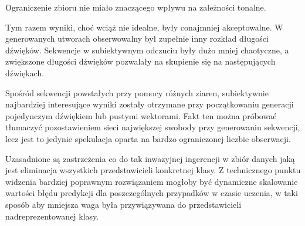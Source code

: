 {{        %

        Ograniczenie zbioru nie miało znaczącego wpływu na zależności tonalne.


        Tym razem wyniki, choć wciąż nie idealne, były conajmniej akceptowalne. W generowanych utworach
        obserwowalny był zupełnie inny rozkład długości dźwięków. Sekwencje w subiektywnym odczuciu były dużo mniej
        chaotyczne, a zwiększone długości dźwięków pozwalały na skupienie się na następujących dźwiękach.
        
        Spośród sekwencji powstałych przy pomocy różnych ziaren, subiektywnie najbardziej interesujące wyniki
        zostały otrzymane przy początkowaniu generacji pojedynczym dźwiękiem lub pustymi wektorami.
        Fakt ten można próbować tłumaczyć pozostawieniem sieci największej swobody przy generowaniu sekwencji, lecz
        jest to jedynie spekulacja oparta na bardzo ograniczonej liczbie obserwacji.

        Uzasadnione są zastrzeżenia co do tak inwazyjnej ingerencji w zbiór danych jaką jest eliminacja 
        wszystkich przedstawicieli konkretnej klasy. Z technicznego punktu widzenia bardziej poprawnym 
        rozwiązaniem mogłoby być dynamiczne skalowanie wartości błędu predykcji dla poszczególnych przypadków w czasie uczenia, 
        w taki sposób aby mniejsza waga była przywiązywana do przedstawicieli nadreprezentowanej klasy.
    }
}